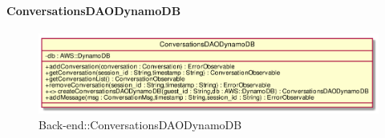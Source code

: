 \hypertarget{ConversationsDAODynamoDB_label}{\paragraph{ConversationsDAODynamoDB}}
\begin{figure}[h]
	\centering
	\includegraphics[width=\textwidth,height=\textheight,keepaspectratio]{images/ClassConversationsDAODynamoDB.png}
	\caption{Back-end::ConversationsDAODynamoDB}
\end{figure}
